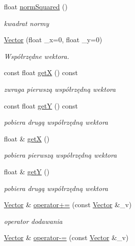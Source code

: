 \begin{DoxyCompactItemize}
float \hyperlink{class_vector_a18d3f2110be751ac3a658016bd3dca69}{norm\-Squared} ()
\begin{DoxyCompactList}\small\item\em kwadrat normy \end{DoxyCompactList}\item 
\hyperlink{class_vector_af3c1b04bfbb10e29433842202365a6c4}{Vector} (float \-\_\-x=0, float \-\_\-y=0)
\begin{DoxyCompactList}\small\item\em Współrzędne wektora. \end{DoxyCompactList}\item 
const float \hyperlink{class_vector_a56cbc43a18559f85f4ce7278e98f9aad}{get\-X} () const 
\begin{DoxyCompactList}\small\item\em zwraga pierwszą współrzędną wektora \end{DoxyCompactList}\item 
const float \hyperlink{class_vector_a4ad8e8a5fb48ce193177af11340831b6}{get\-Y} () const 
\begin{DoxyCompactList}\small\item\em pobiera drugą współrzędną wektora \end{DoxyCompactList}\item 
float \& \hyperlink{class_vector_aeca06c929d4ab3078a828723a88621e6}{get\-X} ()
\begin{DoxyCompactList}\small\item\em pobiera pierwszą współrzędną wektora \end{DoxyCompactList}\item 
float \& \hyperlink{class_vector_ab0cc77ce300a60de0ab734555886ad5d}{get\-Y} ()
\begin{DoxyCompactList}\small\item\em pobiera drugą współrzędną wektora \end{DoxyCompactList}\item 
\hyperlink{class_vector}{Vector} \& \hyperlink{class_vector_a4eeab5be24ee846de3012e67a4e34820}{operator+=} (const \hyperlink{class_vector}{Vector} \&\-\_\-v)
\begin{DoxyCompactList}\small\item\em operator dodawania \end{DoxyCompactList}\item 
\hyperlink{class_vector}{Vector} \& \hyperlink{class_vector_aaaf87dbf15cd9492aa0c11874ae5afef}{operator-\/=} (const \hyperlink{class_vector}{Vector} \&\-\_\-v)

\end{DoxyCompactItemize}
